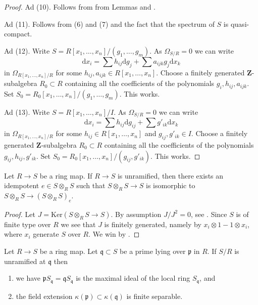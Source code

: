 \begin{proof}
\medskip\noindent
Ad (10). Follows from from Lemmas 
and .

\medskip\noindent
Ad (11). Follows from (6) and (7) and the fact that the spectrum of $S$
is quasi-compact.

\medskip\noindent
Ad (12). Write $S = R[x_1, \ldots, x_n]/(g_1, \ldots, g_m)$.
As $\Omega_{S/R} = 0$ we can write
$$
\text{d}x_i = \sum h_{ij}\text{d}g_j + \sum a_{ijk}g_j\text{d}x_k
$$
in $\Omega_{R[x_1, \ldots, x_n]/R}$
for some $h_{ij}, a_{ijk} \in R[x_1, \ldots, x_n]$.
Choose a finitely generated
$\mathbf{Z}$-subalgebra $R_0 \subset R$ containing all the coefficients of the
polynomials $g_i, h_{ij}, a_{ijk}$. Set
$S_0 = R_0[x_1, \ldots, x_n]/(g_1, \ldots, g_m)$. This works.

\medskip\noindent
Ad (13). Write $S = R[x_1, \ldots, x_n]/I$.
As $\Omega_{S/R} = 0$ we can write
$$
\text{d}x_i = \sum h_{ij}\text{d}g_{ij} + \sum g'_{ik}\text{d}x_k
$$
in $\Omega_{R[x_1, \ldots, x_n]/R}$
for some $h_{ij} \in R[x_1, \ldots, x_n]$ and $g_{ij}, g'_{ik} \in I$.
Choose a finitely generated $\mathbf{Z}$-subalgebra $R_0 \subset R$
containing all the coefficients of the
polynomials $g_{ij}, h_{ij}, g'_{ik}$. Set
$S_0 = R_0[x_1, \ldots, x_n]/(g_{ij}, g'_{ik})$. This works.
\end{proof}

\begin{lemma}
\label{lemma-diagonal-unramified}
Let $R \to S$ be a ring map.
If $R \to S$ is unramified, then there exists an idempotent
$e \in S \otimes_R S$ such that $S \otimes_R S \to S$ is isomorphic
to $S \otimes_R S \to (S \otimes_R S)_e$.
\end{lemma}

\begin{proof}
Let $J = \text{Ker}(S \otimes_R S \to S)$. By assumption
$J/J^2 = 0$, see
.
Since $S$ is of finite type over $R$ we
see that $J$ is finitely generated, namely by
$x_i \otimes 1 - 1 \otimes x_i$, where $x_i$ generate $S$ over $R$.
We win by .
\end{proof}

\begin{lemma}
\label{lemma-unramified-at-prime}
Let $R \to S$ be a ring map.
Let $\mathfrak q \subset S$ be
a prime lying over $\mathfrak p$ in $R$.
If $S/R$ is unramified at $\mathfrak q$ then
\begin{enumerate}
\item we have $\mathfrak p S_{\mathfrak q} = \mathfrak qS_{\mathfrak q}$
is the maximal ideal of the local ring $S_{\mathfrak q}$, and
\item the field extension $\kappa(\mathfrak p) \subset \kappa(\mathfrak q)$
is finite separable.
\end{enumerate}
\end{lemma}

